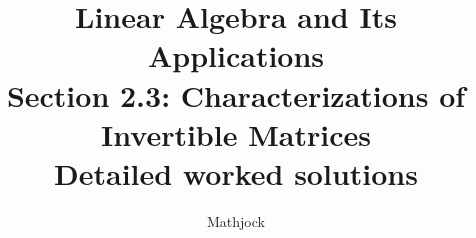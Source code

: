 
\title{\textbf{Linear Algebra and Its Applications}\\[0.3em]Section 2.3: Characterizations of Invertible Matrices\\[0.3em]\large Detailed worked solutions}
\author{Mathjock}
\date{}

\maketitle
\bookinfo
\tableofcontents
\clearpage
\renewcommand{\thesection}{2.\arabic{section}}
\renewcommand{\theHsection}{2.\arabic{section}}
\setcounter{section}{2}


